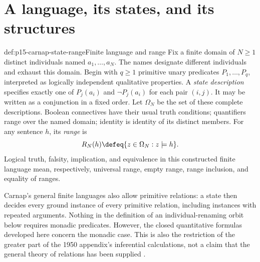 \section{A language, its states, and its structures}
\label{sec:p15-carnap-language}

\begin{hbdefinition}{def:p15-carnap-state-range}{Finite language and range}
Fix a finite domain of \(N\geq1\) distinct individuals named
\(a_1,\ldots,a_N\). The names designate different individuals and
exhaust this domain. Begin with \(q\geq1\) primitive unary predicates
\(P_1,\ldots,P_q\), interpreted as logically independent qualitative
properties. A \emph{state description} specifies exactly one of
\(P_j(a_i)\) and \(\neg P_j(a_i)\) for each pair \((i,j)\).
It may be written as a conjunction in a fixed order. Let \(\Omega_N\)
be the set of these complete descriptions. Boolean connectives have their
usual truth conditions; quantifiers range over the named domain; identity
is identity of its distinct members. For any sentence \(h\), its
\emph{range} is
\[
 R_N(h)\defeq\{z\in\Omega_N:z\models h\}.
\]
Logical truth, falsity, implication, and equivalence in this constructed
finite language mean, respectively, universal range, empty range, range
inclusion, and equality of ranges.
\end{hbdefinition}

Carnap's general finite languages also allow primitive relations: a
state then decides every ground instance of every primitive relation,
including instances with repeated arguments. Nothing in the definition
of an individual-renaming orbit below requires monadic predicates.
However, the closed quantitative formulas developed here concern the
monadic case. This is also the restriction of the greater part of the
1950 appendix's inferential calculations, not a claim that the general
theory of relations has been supplied
\cite[secs.~18, 26--27, 31; sec.~110A, p.~566]{Carnap1950Probability}.

